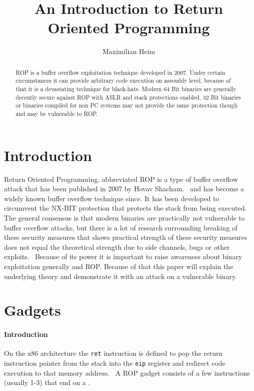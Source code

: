 \documentclass[journal=tosc,submission, notanonymous]{iacrtrans}
\author{Maximilian Heim}
\title{An Introduction to Return Oriented Programming}
\begin{document}
\maketitle




\begin{abstract}
ROP is a buffer overflow exploitation technique developed in 2007. Under certain circumstances it can provide arbitrary code execution on assembly level, because of that it is a devastating technique for black-hats. Modern 64 Bit binaries are generally decently secure against ROP with ASLR and stack protections enabled. 32 Bit binaries or binaries compiled for non PC systems may not provide the same protection though and may be vulnerable to ROP. 
\end{abstract}

\section{Introduction}
Return Oriented Programming, abbreviated ROP is a type of buffer overflow attack that has been published in 2007 by Hovav Shacham.~\cite{ropfirstpaper} and has become a widely known buffer overflow technique since. It has been developed to circumvent the NX-BIT protection that protects the stack from being executed. The general consensus is that modern binaries are practically not vulnerable to buffer overflow attacks, but there is a lot of research surrounding breaking of these security measures that shows practical strength of these security measures does not equal the theoretical strength due to side channels, bugs or other exploits.~\cite{aslr} Because of its power it is important to raise awareness about binary exploitation generally and ROP. Because of that this paper will explain the underlying theory and demonstrate it with an attack on a vulnerable binary.


\section{Gadgets}
\label{sec:gadgets}
\paragraph{Introduction}
On the x86 architecture the \Verb+ret+ instruction is defined to pop the return instruction pointer from the stack into the \Verb+eip+ register and redirect code execution to that memory address.~\cite{retx86} A ROP gadget consists of a few instructions (usually 1-3) that end on a .
\end{document}
